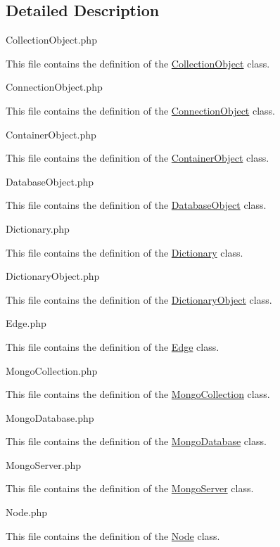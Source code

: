 \subsection{Detailed Description}
Collection\-Object.\-php

This file contains the definition of the \hyperlink{class_ontology_wrapper_1_1_collection_object}{Collection\-Object} class.

Connection\-Object.\-php

This file contains the definition of the \hyperlink{class_ontology_wrapper_1_1_connection_object}{Connection\-Object} class.

Container\-Object.\-php

This file contains the definition of the \hyperlink{class_ontology_wrapper_1_1_container_object}{Container\-Object} class.

Database\-Object.\-php

This file contains the definition of the \hyperlink{class_ontology_wrapper_1_1_database_object}{Database\-Object} class.

Dictionary.\-php

This file contains the definition of the \hyperlink{class_ontology_wrapper_1_1_dictionary}{Dictionary} class.

Dictionary\-Object.\-php

This file contains the definition of the \hyperlink{class_ontology_wrapper_1_1_dictionary_object}{Dictionary\-Object} class.

Edge.\-php

This file contains the definition of the \hyperlink{class_ontology_wrapper_1_1_edge}{Edge} class.

Mongo\-Collection.\-php

This file contains the definition of the \hyperlink{class_ontology_wrapper_1_1_mongo_collection}{Mongo\-Collection} class.

Mongo\-Database.\-php

This file contains the definition of the \hyperlink{class_ontology_wrapper_1_1_mongo_database}{Mongo\-Database} class.

Mongo\-Server.\-php

This file contains the definition of the \hyperlink{class_ontology_wrapper_1_1_mongo_server}{Mongo\-Server} class.

Node.\-php

This file contains the definition of the \hyperlink{class_ontology_wrapper_1_1_node}{Node} class.

